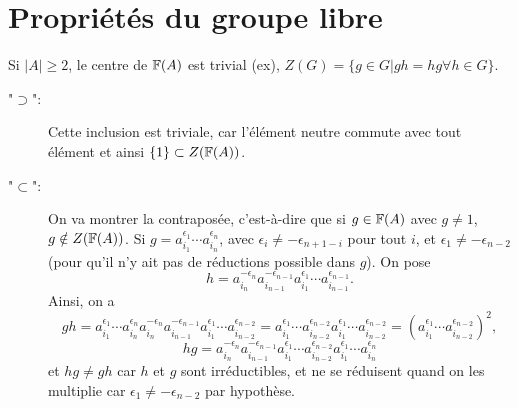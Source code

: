 
\chapter{Propriétés du groupe libre}

  \begin{prop}
    Si $|A| \geq 2$, le centre de $\mathbb{F}(A)$ est trivial (ex), $Z(G) = \{g \in G | gh=hg \forall h \in G\}$.
  \end{prop}

  \begin{preuve}
    \begin{description}
    \item["$\supset$":] Cette inclusion est triviale, car l'élément neutre commute avec tout élément et ainsi
      $\{1\} \subset Z(\mathbb{F}(A))$.

    \item["$\subset$":] On va montrer la contraposée, c'est-à-dire que si $g \in \mathbb{F}(A)$ avec $g \neq 1$, $g
      \notin Z(\mathbb{F}(A))$. Si $g = a_{i_1}^{\epsilon_1} \cdots a_{i_n}^{\epsilon_n}$, avec $\epsilon_i \neq
      -\epsilon_{n+1-i}$ pour tout $i$, et $\epsilon_1 \neq -\epsilon_{n-2}$ (pour qu'il n'y ait pas de réductions possible dans $g$). On pose
        \[h = a_{i_n}^{-\epsilon_n}a_{i_{n-1}}^{-\epsilon_{n-1}}a_{i_1}^{\epsilon_1} \cdots a_{i_{n-1}}^{\epsilon_{n-1}}.\]
      Ainsi, on a 
        \[gh = a_{i_1}^{\epsilon_1} \cdots a_{i_n}^{\epsilon_n} a_{i_n}^{-\epsilon_n}a_{i_{n-1}}^{-\epsilon_{n-1}}a_{i_1}^{\epsilon_1}
        \cdots a_{i_{n-2}}^{\epsilon_{n-2}} =  a_{i_1}^{\epsilon_1} \cdots a_{i_{n-2}}^{\epsilon_{n-2}}
        a_{i_1}^{\epsilon_1} \cdots a_{i_{n-2}}^{\epsilon_{n-2}} = (a_{i_1}^{\epsilon_1} \cdots
        a_{i_{n-2}}^{\epsilon_{n-2}})^2,\]
        \[hg = a_{i_n}^{-\epsilon_n}a_{i_{n-1}}^{-\epsilon_{n-1}}a_{i_1}^{\epsilon_1} \cdots a_{i_{n-2}}^{\epsilon_{n-2}}
        a_{i_1}^{\epsilon_1} \cdots a_{i_n}^{\epsilon_n}\]
      et $hg \neq gh$ car $h$ et $g$ sont irréductibles, et ne se réduisent quand on les multiplie car
      $\epsilon_1 \neq -\epsilon_{n-2}$ par hypothèse.
    \end{description}
  \end{preuve}

